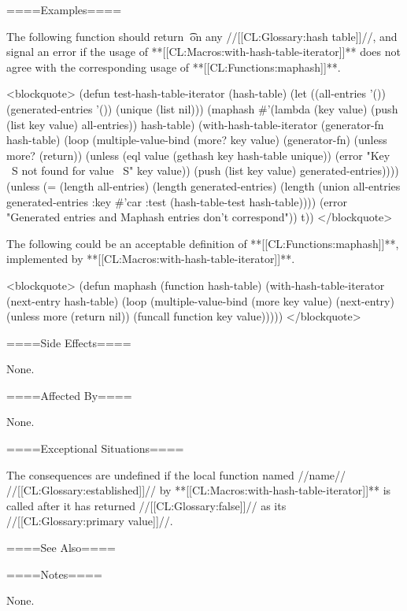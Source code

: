 ====Examples====

The following function should return \t\ on any //[[CL:Glossary:hash table]]//, and signal an error if the usage of **[[CL:Macros:with-hash-table-iterator]]** does not agree with the corresponding usage of **[[CL:Functions:maphash]]**.

<blockquote> (defun test-hash-table-iterator (hash-table) (let ((all-entries '()) (generated-entries '()) (unique (list nil))) (maphash #'(lambda (key value) (push (list key value) all-entries)) hash-table) (with-hash-table-iterator (generator-fn hash-table) (loop (multiple-value-bind (more? key value) (generator-fn) (unless more? (return)) (unless (eql value (gethash key hash-table unique)) (error "Key ~S not found for value ~S" key value)) (push (list key value) generated-entries)))) (unless (= (length all-entries) (length generated-entries) (length (union all-entries generated-entries :key #'car :test (hash-table-test hash-table)))) (error "Generated entries and Maphash entries don't correspond")) t)) </blockquote>

The following could be an acceptable definition of **[[CL:Functions:maphash]]**, implemented by **[[CL:Macros:with-hash-table-iterator]]**.

<blockquote> (defun maphash (function hash-table) (with-hash-table-iterator (next-entry hash-table) (loop (multiple-value-bind (more key value) (next-entry) (unless more (return nil)) (funcall function key value))))) </blockquote>

====Side Effects====

None.

====Affected By====

None.

====Exceptional Situations====

The consequences are undefined if the local function named //name// //[[CL:Glossary:established]]// by **[[CL:Macros:with-hash-table-iterator]]** is called after it has returned //[[CL:Glossary:false]]// as its //[[CL:Glossary:primary value]]//.

====See Also====

{\secref\TraversalRules}

====Notes====

None.

  
